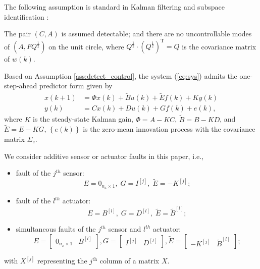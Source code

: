 \documentclass[twocolumn]{autart}
\begin{document}
The following assumption is standard in Kalman filtering \cite{Kailath2000} and subspace identification \cite{Chiuso2007a, Kata2005}:
\begin{assum}\label{ass:detect_control}
The pair $\left( C, A \right)$ is assumed detectable; and there are no uncontrollable modes of $\left( A, F Q^{\frac{1}{2}} \right)$ on the unit circle, where $Q^{\frac{1}{2}} \cdot \left( Q^{\frac{1}{2}} \right)^\mathrm{T} = Q$ is the covariance matrix of $w(k)$.
\end{assum}


Based on Assumption \ref{ass:detect_control}, the system (\ref{eq:sys}) admits the one-step-ahead predictor form given by \cite{Kailath2000}
\begin{equation}\label{eq:predictor}
\begin{aligned}
x(k+1) &= \Phi x(k) + \tilde B u(k) + \tilde E f(k) + K y(k) \\
y(k) &= C x(k) + D u(k) + G f(k) + e(k),
\end{aligned}
\end{equation}
where $K$ is the steady-state Kalman gain, $\Phi = A - KC$, $\tilde B = B - KD$, and $\tilde E = E - KG$, $\left\{e(k)\right\}$ is the zero-mean innovation process with the covariance matrix $\Sigma_e$. 	


We consider additive sensor or actuator faults in this paper, i.e.,
\begin{itemize}
\item fault of the $j^{th}$ sensor: 
	\begin{equation}\label{eq:senfault_model}
	E = 0_{n_x \times 1}, \; G = I^{[j]},\; \tilde E = - K^{[j]};
	\end{equation}
\item fault of the $l^{th}$ actuator: 
	\begin{equation}\label{eq:actfault_model}
	E = B^{[l]}, \; G = D^{[l]},\; \tilde E = \tilde B^{[l]};
	\end{equation}
\item simultaneous faults of the $j^{th}$ sensor and $l^{th}$ actuator: 
	\begin{equation}\label{eq:senactfault_model}
	E = \left[\begin{matrix}
	0_{n_x \times 1} & B^{[l]}
	\end{matrix}\right], 
	G = \left[ \begin{matrix}
	I^{[j]} & D^{[l]}
	\end{matrix} \right], 
	\tilde E = \left[\begin{matrix}
	- K^{[j]} & \tilde B^{[l]}
	\end{matrix}\right];
	\end{equation}
\end{itemize}
with $X^{[j]}$ representing the $j^{\mathrm{th}}$ column of a matrix $X$. 
\end{document}
